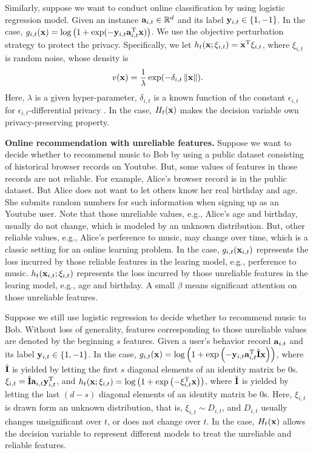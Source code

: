 \documentclass{article}
\begin{document}
{Similarly, suppose we want to conduct online classification by using logistic regression model. Given an instance ${\bf a}_{i,t} \in \mathbb{R}^d$ and its label ${\bf y}_{i,t} \in \{1,-1\}$.  In the case, $g_{i,t}({\bf x}) = \log\left( 1 + \exp(-{\bf y}_{i,t}{\bf a}_{i,t}^{\rm T} {\bf x}) \right)$. We use the objective perturbation strategy \citep{Chaudhuri:2011tr,NIPS2017_6865} to protect the privacy. Specifically, we let $h_t({\bf x};\xi_{i,t}) = {\bf x}^{\rm T}\xi_{i,t}$, where $\xi_{i,t}$ is random noise, whose density is 
\begin{align}
\nonumber
v({\bf x}) = \frac{1}{\lambda}\exp(-\delta_{i,t} \left\lVert{\bf x}\right\rVert).
\end{align} Here, $\lambda$ is a given hyper-parameter, $\delta_{i,t}$ is a known function of the constant $\epsilon_{i,t}$ for $\epsilon_{i,t}$-differential privacy \citep{Dwork:2014gx}. In the case, $H_t({\bf x})$ makes the decision variable own privacy-preserving property.




\textbf{Online recommendation with unreliable features.} Suppose we want to decide whether to recommend music to Bob by using a public dataset consisting of historical browser records on Youtube. But, some values of features in those records are not reliable. For example, Alice's browser record is in the public dataset. But Alice does not want to let others know her real birthday and age. She submits random numbers for such information when signing up as an Youtube user. Note that those unreliable values, e.g., Alice's age and birthday, usually do not change, which is modeled by an unknown distribution. But, other reliable values, e.g., Alice's perference to music, may change over time, which is a classic setting for an online learning problem.  In the case, $g_{i,t}({\bf x}_{i,t})$ represents the loss incurred by those reliable features in the learing model, e.g., perference to music. $h_{t}({\bf x}_{i,t};\xi_{i,t})$ represents the loss incurred by those unreliable features in the  learing model, e.g., age and birthday. A small $\beta$ means significant attention on those unreliable features.


Suppose we still use logistic regression to decide whether to recommend music to Bob. Without loss of generality, features corresponding to those unreliable values are denoted by the beginning $s$ features.  Given a user's behavior record ${\bf a}_{i,t}$ and its label ${\bf y}_{i,t}\in \{1,-1\}$. In the case, $g_{i,t}({\bf x}) = \log \left( 1 + \exp\left( -{\bf y}_{i,t}{\bf a}_{i,t}^{\rm T} \hat{{\bf I}} {\bf x} \right)  \right)$, where $\hat{{\bf I}}$ is yielded by letting the first $s$ diagonal elements of an identity matrix be $0$s. $\xi_{i,t} = \check{{\bf I}} {\bf a}_{i,t} {\bf y}_{i,t}^{\rm T}$, and $h_t({\bf x}; \xi_{i,t}) = \log \left( 1 + \exp\left( - \xi_{i,t}^{\rm T} {\bf x} \right) \right)$, where $\check{{\bf I}}$ is yielded by letting the last $(d-s)$ diagonal elements of an identity matrix be $0$s. Here, $\xi_{i,t}$ is drawn form an unknown distribution, that is, $\xi_{i,t} \sim D_{i,t}$, and $D_{i,t}$ usually changes unsignificant over $t$, or does not change over $t$. In the case, $H_t({\bf x})$ allows the decision variable to represent different models to treat the unreliable and reliable features.





}
\end{document}
